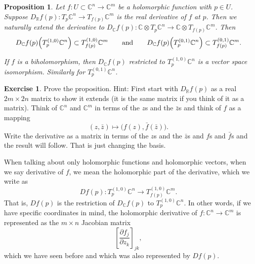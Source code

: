 \documentclass[12pt,openany]{book}
\newcommand{\C}{{\mathbb{C}}}
\newcommand{\R}{{\mathbb{R}}}
\theoremstyle{plain}
\newtheorem{prop}[thm]{Proposition}
\theoremstyle{remark}
\theoremstyle{definition}
\newenvironment{exbox}{%
    \def\FrameCommand{\vrule width 1pt \relax\hspace {10pt}}%
    \MakeFramed {\advance \hsize -\width \FrameRestore }%
}{%
    \endMakeFramed
}
\theoremstyle{exercise}
\newtheorem{exercise}{Exercise}[section]
\theoremstyle{example}
\begin{document}
\begin{prop} \label{prop:holvectmap}
Let $f \colon U \subset \C^n \to \C^m$ be a holomorphic function with
$p \in U$.
Suppose 
$D_\R f(p) \colon T_p\C^n \to T_{f(p)} \C^m$
is the real derivative of $f$ at $p$.
%
Then we naturally
extend the derivative to $D_\C f(p) \colon \C \otimes T_p\C^n \to \C \otimes  T_{f(p)}
\C^m$.  Then
\begin{equation*}
D_\C f(p)\Bigl(T_p^{(1,0)} \C^n\Bigr) \subset T_{f(p)}^{(1,0)} \C^m
\qquad \text{and} \qquad
D_\C f(p)\Bigl(T_p^{(0,1)} \C^n\Bigr) \subset T_{f(p)}^{(0,1)} \C^m .
\end{equation*}

If $f$ is a biholomorphism, then $D_\C f(p)$ restricted to $T_p^{(1,0)} \C^n$
is a vector space isomorphism.  Similarly for $T_p^{(0,1)} \C^n$.
\end{prop}

\begin{exbox}
\begin{exercise}
Prove the proposition.
Hint: First start with $D_\R f(p)$ as a real $2m \times 2n$ matrix to show it
extends (it is the same matrix if you think of it as a matrix).  Think of $\C^n$ and $\C^m$ in terms of the $z$s and the
$\bar{z}$s and think of $f$ as a mapping
\begin{equation*}
(z,\bar{z}) \mapsto \bigl( f(z) , \bar{f}(\bar{z}) \bigr) .
\end{equation*}
Write the derivative as a matrix in terms of the $z$s and the $\bar{z}$s
and $f$s and $\bar{f}$s and the result will follow.  That is just changing
the basis.
\end{exercise}
\end{exbox}

When talking about only holomorphic functions and holomorphic vectors,
when we say derivative of $f$, we mean the holomorphic part of the
derivative, which we write as
%
\begin{equation*}
D f(p) \colon T_p^{(1,0)} \C^n \to T_{f(p)}^{(1,0)} \C^m .
\end{equation*}
That is, $Df(p)$ is the restriction of $D_\C f(p)$ to $T_p^{(1,0)} \C^n$.
In other words,
if we have specific coordinates in mind, the
holomorphic derivative of $f \colon \C^{n} \to \C^m$ is represented
as the $m \times n$ Jacobian matrix
\begin{equation*}
\left[
\frac{\partial f_j}{\partial z_k}
\right]_{jk} ,
\end{equation*}
which we have seen before and which was also represented by
$Df(p)$.
\end{document}
